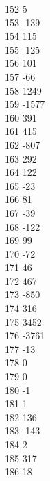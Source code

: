 { 152	5 \\
 153	-139 \\
 154	115 \\
 155	-125 \\
 156	101 \\
 157	-66 \\
 158	1249 \\
 159	-1577 \\
 160	391 \\
 161	415 \\
 162	-807 \\
 163	292 \\
 164	122 \\
 165	-23 \\
 166	81 \\
 167	-39 \\
 168	-122 \\
 169	99 \\
 170	-72 \\
 171	46 \\
 172	467 \\
 173	-850 \\
 174	316 \\
 175	3452 \\
 176	-3761 \\
 177	-13 \\
 178	0 \\
 179	0 \\
 180	-1 \\
 181	1 \\
 182	136 \\
 183	-143 \\
 184	2 \\
 185	317 \\
 186	18 \\
}
